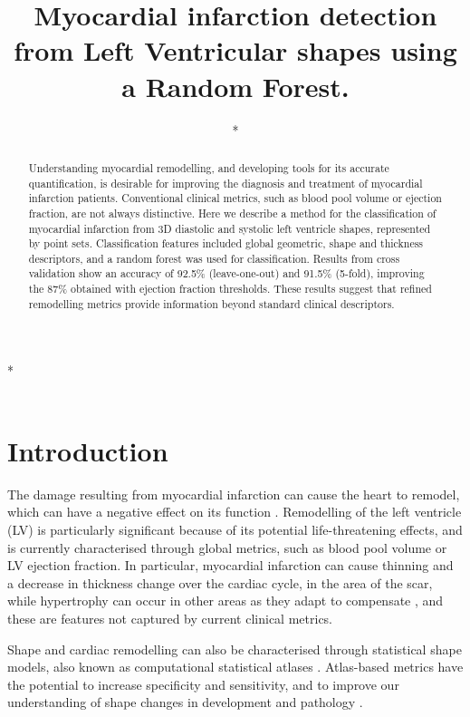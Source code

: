 \documentclass{llncs}
\begin{document}
\title{Myocardial infarction detection from Left Ventricular shapes using a Random Forest.}

\author{*}

\institute
{*\\
\email{*}\\
}
\maketitle              %
\begin{abstract}
Understanding myocardial remodelling, and developing tools for its accurate quantification, is desirable for improving the diagnosis and treatment of myocardial infarction patients. Conventional clinical metrics, such as blood pool volume or ejection fraction, are not always distinctive. Here we describe a method for the classification of myocardial infarction from 3D diastolic and systolic left ventricle shapes, represented by point sets. Classification features included global geometric, shape and thickness descriptors, and a random forest was used for classification. Results from cross validation show an accuracy of 92.5\% (leave-one-out) and 91.5\% (5-fold), improving the 87\% obtained with ejection fraction thresholds. These results suggest that refined remodelling metrics provide information beyond standard clinical descriptors.

\end{abstract}
%
\section{Introduction}
The damage resulting from myocardial infarction can cause the heart to remodel, which can have a negative effect on its function \cite{Sutton2000}. Remodelling of the left ventricle (LV) is particularly significant because of its potential life-threatening effects, and is currently characterised through global metrics, such as blood pool volume or LV ejection fraction. In particular, myocardial infarction can cause thinning and a decrease in thickness change over the cardiac cycle, in the area of the scar, while hypertrophy can occur in other areas as they adapt to compensate \cite{Sutton2000}, and these are features not captured by current clinical metrics. 

 

Shape and cardiac remodelling can also be characterised through statistical shape models, also known as computational statistical atlases \cite{Cootes1992,Young2009}. Atlas-based metrics have the potential to increase  specificity and sensitivity, and to improve our understanding of shape changes in development and pathology \cite{Lewandowski2012,Lorenz2006}. 
\end{document}
